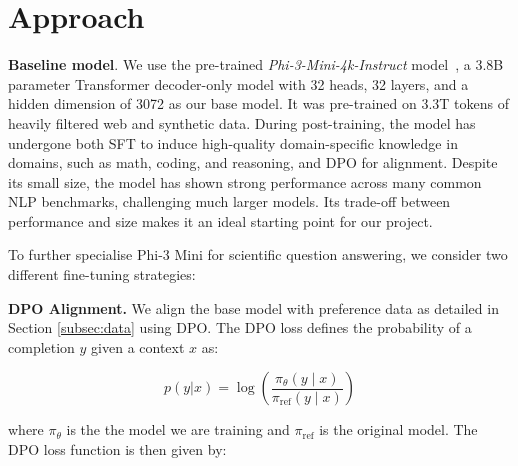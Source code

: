 \section{Approach}
\label{sec:approach}


\textbf{Baseline model}. We use the pre-trained
\textit{Phi-3-Mini-4k-Instruct}
model~\cite{phi3}, a 3.8B parameter Transformer decoder-only model with 32
heads, 32 layers, and a hidden dimension of 3072 as our base model. It was pre-trained on 3.3T tokens
of heavily filtered web and synthetic data.
During post-training, the model has undergone both SFT
to induce high-quality domain-specific knowledge in domains, such as math,
coding, and reasoning, and DPO for alignment. Despite its small size,
the model has shown strong performance across many common NLP benchmarks,
challenging much larger models.
Its trade-off between performance and size makes it an ideal starting point for
our project.

To further specialise Phi-3 Mini for scientific question answering, we consider two different fine-tuning strategies:

\textbf{DPO Alignment.} We align the base model with preference data as detailed in Section \ref{subsec:data} using DPO. The DPO loss defines the probability of a completion $y$ given a context $x$ as:

\begin{equation}
    \label{eq:dpo-comp-prob}
    p(y | x) = \log \left( \frac{\pi_\theta(y \mid x)}{\pi_{\text{ref}}(y \mid x)} \right)
\end{equation}

where $\pi_\theta$ is the the model we are training and $\pi_{\text{ref}}$ is the original model. The DPO loss function is then given by:


